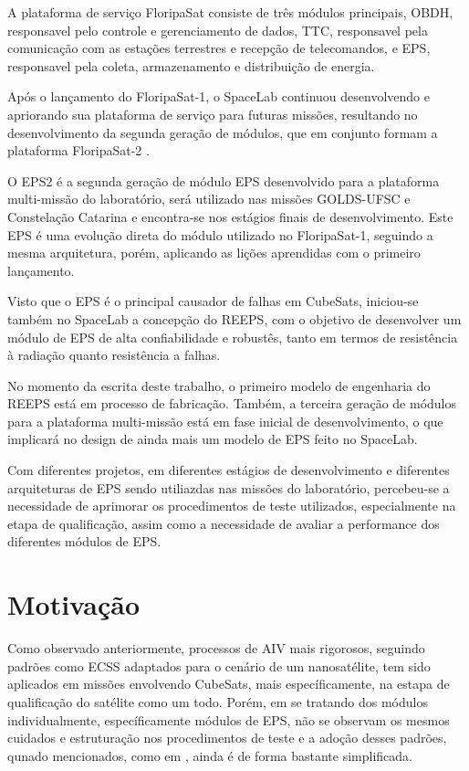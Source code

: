 A plataforma de serviço FloripaSat consiste de três módulos principais, \gls{OBDH}, responsavel pelo controle e gerenciamento de dados, \gls{TTC}, responsavel pela comunicação com as estações terrestres e recepção de telecomandos, e \gls{EPS}, responsavel pela coleta, armazenamento e distribuição de energia.

Após o lançamento do FloripaSat-1, o SpaceLab continuou desenvolvendo e apriorando sua plataforma de serviço para futuras missões, resultando no desenvolvimento da segunda geração de módulos, que em conjunto formam a plataforma FloripaSat-2 \cite{floripasat2}.

O \gls{EPS2} é a segunda geração de módulo \gls{EPS} desenvolvido para a plataforma multi-missão do laboratório, será utilizado nas missões GOLDS-UFSC e Constelação Catarina e encontra-se nos estágios finais de desenvolvimento. Este \gls{EPS} é uma evolução direta do módulo utilizado no FloripaSat-1, seguindo a mesma arquitetura, porém, aplicando as lições aprendidas com o primeiro lançamento.

Visto que o \gls{EPS} é o principal causador de falhas em CubeSats, iniciou-se também no SpaceLab a concepção do \gls{REEPS}, com o objetivo de desenvolver um módulo de \gls{EPS} de alta confiabilidade e robustês, tanto em termos de resistência à radiação quanto resistência a falhas.

No momento da escrita deste trabalho, o primeiro modelo de engenharia do \gls{REEPS} está em processo de fabricação.
Também, a terceira geração de módulos para a plataforma multi-missão está em fase inicial de desenvolvimento, o que implicará no design de ainda mais um modelo de \gls{EPS} feito no SpaceLab.

Com diferentes projetos, em diferentes estágios de desenvolvimento e diferentes arquiteturas de \gls{EPS} sendo utiliazdas nas missões do laboratório, percebeu-se a necessidade de aprimorar os procedimentos de teste utilizados, especialmente na etapa de qualificação, assim como a necessidade de avaliar a performance dos diferentes módulos de \gls{EPS}.

\section{Motivação}\label{sec:intro-motivacao}

Como observado anteriormente, processos de \gls{AIV} mais rigorosos, seguindo padrões como \gls{ECSS} adaptados para o cenário de um nanosatélite, tem sido aplicados em missões envolvendo CubeSats, mais específicamente, na estapa de qualificação do satélite como um todo.
Porém, em se tratando dos módulos individualmente, específicamente módulos de EPS, não se observam os mesmos cuidados e estruturação nos procedimentos de teste e a adoção desses padrões, qunado mencionados, como em \textcite{mist-eps}, ainda é de forma bastante simplificada.

